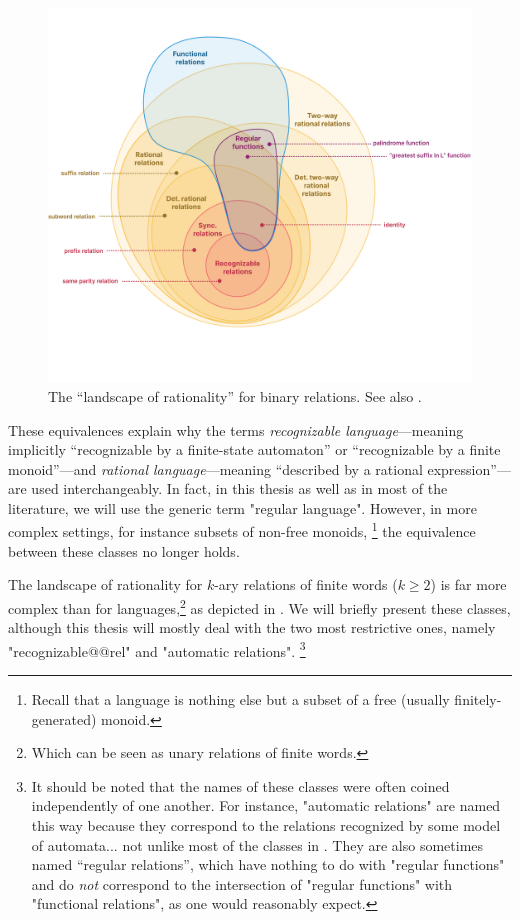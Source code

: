 \begin{figure}
	\centering
	\includegraphics[width=\linewidth]{fig/landscape-rationality-relations.png}
	\caption{
		\AP\label{fig:landscape-rationality-relations}
		The ``landscape of rationality'' for binary relations.
		See also .
	}
\end{figure}
These equivalences explain why the terms \emph{recognizable language}---meaning implicitly
``recognizable by a finite-state automaton'' or ``recognizable by a finite monoid''---and
\emph{rational language}---meaning ``described by a rational expression''---are used 
interchangeably. In fact, in this thesis as well as in most of the literature,
we will use the generic term "regular language".
However, in more complex settings, for instance subsets of non-free monoids,%
\footnote{Recall that a language is nothing else but a subset of a free
(usually finitely-generated) monoid.}
the equivalence between these classes no longer holds. \cite{Pin2021StackExchange}

The landscape of rationality for $k$-ary relations of finite words ($k \geq 2$) is far more complex than for languages,\footnote{Which can be seen as unary relations of finite words.} as depicted in . We will briefly present these classes,
although this thesis will mostly deal with the two most restrictive ones, namely
"recognizable@@rel" and "automatic relations".%
\footnote{It should be noted that the names
of these classes were often coined independently of one another.
For instance, "automatic relations" are named this way because they correspond to
the relations recognized by some model of automata...
not unlike most of the classes in .
They are also sometimes named ``regular relations'', which have nothing to do
with "regular functions" and do \emph{not} correspond to the intersection of "regular functions"
with "functional relations", as one would reasonably expect.}

